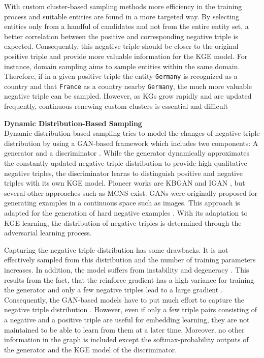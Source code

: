 With custom cluster-based sampling methods more efficiency in the training process and suitable entities are found in a more targeted way.
By selecting entities only from a handful of candidates and not from the entire entity set, a better correlation between the positive and corresponding negative triple is expected.
Consequently, this negative triple should be closer to the original positive triple and provide more valuable information for the \ac{KGE} model.
For instance, domain sampling \cite{domainSampling} aims to sample entities within the same domain.
Therefore, if in a given positive triple  the entity \texttt{Germany} is recognized as a country and that \texttt{France} as a country nearby \texttt{Germany}, the much more valuable negative triple  can be sampled.
However, as \acp{KG} grow rapidly and are updated frequently, continuous renewing custom clusters is essential and difficult \cite{qianunderstanding}


\textbf{Dynamic Distribution-Based Sampling} \label{subsubsec:dynamic_distribution_based_sampling}\\
%
Dynamic distribution-based sampling tries to model the changes of negative triple distribution by using a \ac{GAN}-based framework which includes two components: 
A generator and a discriminator \cite{zhang2021efficient}.
While the generator dynamically approximates the constantly updated negative triple distribution to provide high-qualitative negative triples,
the discriminator learns to distinguish positive and negative triples with its own \ac{KGE} model.
Pioneer works are \ac{KBGAN} \cite{cai2017kbgan} and \ac{IGAN} \cite{IGAN}, but several other approaches such as \ac{MCNS} \cite{MCNS} exist.
\acp{GAN} were originally proposed for generating examples in a continuous space such as images.
This approach is adapted for the generation of hard negative examples \cite{zhang2021efficient}.
With its adaptation to \ac{KGE} learning, the distribution of negative triples is determined through the adversarial learning process.  

Capturing the negative triple distribution has some drawbacks.
It is not effectively sampled from this distribution and the number of training parameters increases.
In addition, the model suffers from instability and degeneracy \cite{zhang2021efficient}.
This results from the fact, that the reinforce gradient has a high variance for training the generator and only a few negative triples lead to a large gradient \cite{zhang2021efficient}.
Consequently, the \ac{GAN}-based models have to put much effort to capture the negative triple distribution \cite{zhang2021efficient}.
However, even if only a few triple pairs consisting of a negative and a positive triple are useful for embedding learning, they are not maintained to be able to learn from them at a later time.
Moreover, no other information in the graph is included except the softmax-probability outputs of the generator and the \ac{KGE} model of the discriminator.